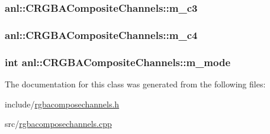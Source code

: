 \hypertarget{classanl_1_1CRGBACompositeChannels_a748b48ef0acbad41d14b63db8edde2ce}{
\subsubsection[{m\_\-c3}]{ {\bf anl::CRGBACompositeChannels::m\_\-c3}}}
\label{classanl_1_1CRGBACompositeChannels_a748b48ef0acbad41d14b63db8edde2ce}
\hypertarget{classanl_1_1CRGBACompositeChannels_a527dafbaaeecbfd9e736c62241ce4be8}{
\subsubsection[{m\_\-c4}]{ {\bf anl::CRGBACompositeChannels::m\_\-c4}}}
\label{classanl_1_1CRGBACompositeChannels_a527dafbaaeecbfd9e736c62241ce4be8}
\hypertarget{classanl_1_1CRGBACompositeChannels_a51db3228839a789689f2e065c40d559b}{
\subsubsection[{m\_\-mode}]{\setlength{\rightskip}{0pt plus 5cm}int {\bf anl::CRGBACompositeChannels::m\_\-mode}}}
\label{classanl_1_1CRGBACompositeChannels_a51db3228839a789689f2e065c40d559b}


The documentation for this class was generated from the following files:\begin{DoxyCompactItemize}
\item 
include/\hyperlink{rgbacomposechannels_8h}{rgbacomposechannels.h}\item 
src/\hyperlink{rgbacomposechannels_8cpp}{rgbacomposechannels.cpp}\end{DoxyCompactItemize}
